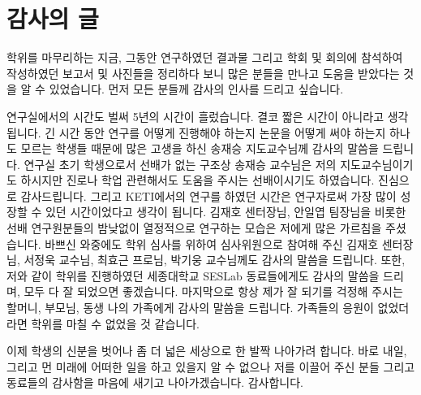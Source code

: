 
\section*{감사의 글} 						
학위를 마무리하는 지금, 그동안 연구하였던 결과물 그리고 학회 및 회의에 참석하여 작성하였던 보고서 및 사진들을 정리하다 보니 많은 분들을 만나고 도움을 받았다는 것을 알 수 있었습니다. 먼저 모든 분들께 감사의 인사를 드리고 싶습니다.

연구실에서의 시간도 벌써 5년의 시간이 흘렀습니다. 결코 짧은 시간이 아니라고 생각됩니다. 긴 시간 동안 연구를 어떻게 진행해야 하는지 논문을 어떻게 써야 하는지 하나도 모르는 학생들 때문에 많은 고생을 하신 송재승 지도교수님께 감사의 말씀을 드립니다. 연구실 초기 학생으로서 선배가 없는 구조상 송재승 교수님은 저의 지도교수님이기도 하시지만 진로나 학업 관련해서도 도움을 주시는 선배이시기도 하였습니다. 진심으로 감사드립니다. 그리고 KETI에서의 연구를 하였던 시간은 연구자로써 가장 많이 성장할 수 있던 시간이었다고 생각이 됩니다. 김재호 센터장님, 안일엽 팀장님을 비롯한 선배 연구원분들의 밤낮없이 열정적으로 연구하는 모습은 저에게 많은 가르침을 주셨습니다. 바쁘신 와중에도 학위 심사를 위하여 심사위원으로 참여해 주신 김재호 센터장님, 서정욱 교수님, 최효근 프로님, 박기웅 교수님께도 감사의 말씀을 드립니다. 또한, 저와 같이 학위를 진행하였던 세종대학교 SESLab 동료들에게도 감사의 말씀을 드리며, 모두 다 잘 되었으면 좋겠습니다. 마지막으로 항상 제가 잘 되기를 걱정해 주시는 할머니, 부모님, 동생 나의 가족에게 감사의 말씀을 드립니다. 가족들의 응원이 없었더라면 학위를 마칠 수 없었을 것 같습니다.

이제 학생의 신분을 벗어나 좀 더 넓은 세상으로 한 발짝 나아가려 합니다. 바로 내일, 그리고 먼 미래에 어떠한 일을 하고 있을지 알 수 없으나 저를 이끌어 주신 분들 그리고 동료들의 감사함을 마음에 새기고 나아가겠습니다. 감사합니다.

\clearpage
